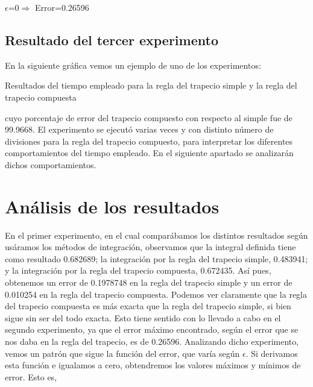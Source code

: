 $\epsilon$=0$\Rightarrow$ Error=0.26596

\subsection{Resultado del tercer experimento}

En la siguiente gráfica vemos un ejemplo de uno de los experimentos:

Resultados del tiempo empleado para la regla del trapecio simple y la regla del trapecio compuesta


cuyo porcentaje de error del trapecio compuesto con respecto al simple fue de 99.9668.
El experimento se ejecutó varias veces y con distinto número de divisiones para la regla del trapecio compuesto,
para interpretar los diferentes comportamientos del tiempo empleado. En el siguiente apartado se analizarán dichos comportamientos.


\section{Análisis de los resultados}
\label{3:sec:4}
\parindent=1cm
\raggedright
 En el primer experimento, en el cual comparábamos los distintos resultados según usáramos los métodos de integración,
 observamos que la integral definida tiene como resultado 0.682689; la integración por la regla del trapecio simple, 0.483941;
 y la integración por la regla del trapecio compuesta, 0.672435.
Así pues, obtenemos un error de 0.1978748 en la regla del trapecio simple y un error de 0.010254 en la regla del trapecio compuesta.
Podemos ver claramente que la regla del trapecio compuesta es más exacta que la regla del trapecio simple, si bien sigue sin ser del todo exacta.
Esto tiene sentido con lo llevado a cabo en el segundo experimento, ya que el error máximo encontrado, según el error que se nos daba en la regla del trapecio,
es de 0.26596. Analizando dicho experimento, vemos un patrón que sigue la función del error, que varía según $\epsilon$.
Si derivamos esta función e igualamos a cero, obtendremos los valores máximos y mínimos de error. Esto es,

